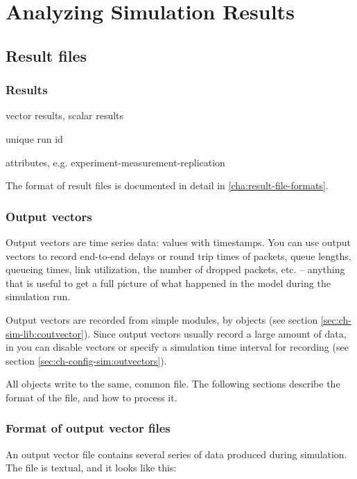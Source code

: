 \chapter{Analyzing Simulation Results}
\label{cha:analyzing-simulation-results}


\section{Result files}

\subsection{Results}

vector results, scalar results

unique run id

attributes, e.g. experiment-measurement-replication

The format of result files is documented in detail in \ref{cha:result-file-formats}.

\subsection{Output vectors}
\label{sec:ch-ana-sim:output-vectors}

Output vectors are time series data: values with timestamps.
You can use output vectors to record end-to-end delays or
round trip times of packets, queue lengths, queueing times,
link utilization, the number of dropped packets, etc. --
anything that is useful to get a full picture of what happened
in the model during the simulation run.

Output vectors are recorded from simple modules, by  objects
(see section \ref{sec:ch-sim-lib:coutvector}). Since output vectors usually
record a large amount of data, in  you can disable vectors
or specify a simulation time interval for recording
(see section \ref{sec:ch-config-sim:outvectors}).

All  objects write to the same, common file.
The following sections describe the format of the file, and
how to process it.


\subsection{Format of output vector files}

An output vector file contains several
series of data produced during simulation. The file is textual, and it
looks like this:


